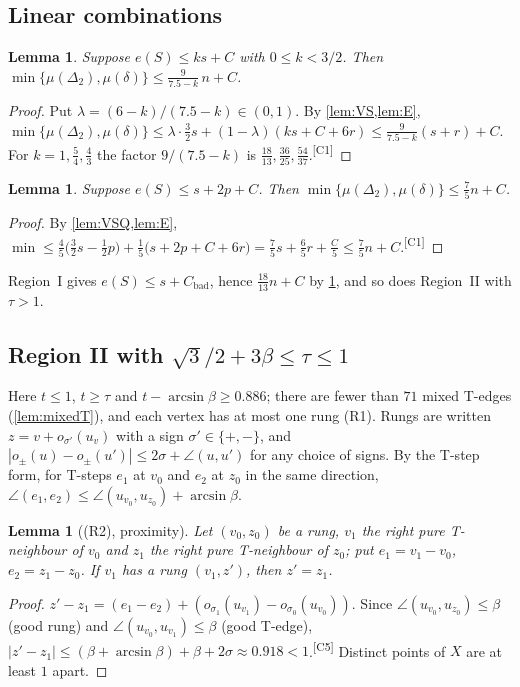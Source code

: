 \documentclass[11pt]{amsart}
\newtheorem{lemma}[theorem]{Lemma}
\theoremstyle{definition}
\theoremstyle{remark}
\newcommand{\Dt}{\Delta_2}
\newcommand{\mult}{\mu}
\newcommand{\chk}[1]{\textsuperscript{[#1]}}
\begin{document}
\subsection*{Linear combinations}
\begin{lemma}\label{lem:lp}
Suppose $e(S)\le k s+C$ with $0\le k<3/2$. Then $\min\{\mult(\Dt),\mult(\delta)\}\le \frac{9}{7.5-k}\,n+C$.
\end{lemma}
\begin{proof}
Put $\lambda=(6-k)/(7.5-k)\in(0,1)$. By \cref{lem:VS,lem:E},
$\min\{\mult(\Dt),\mult(\delta)\}\le\lambda\cdot\tfrac32 s+(1-\lambda)(ks+C+6r)\le \tfrac{9}{7.5-k}(s+r)+C$.
For $k=1,\frac54,\frac43$ the factor $9/(7.5-k)$ is $\frac{18}{13},\frac{36}{25},\frac{54}{37}$.\chk{C1}
\end{proof}

\begin{lemma}\label{lem:lp2}
Suppose $e(S)\le s+2p+C$. Then $\min\{\mult(\Dt),\mult(\delta)\}\le\frac75 n+C$.
\end{lemma}
\begin{proof}
By \cref{lem:VSQ,lem:E},
$\min\le\frac45\bigl(\frac32 s-\frac12p\bigr)+\frac15\bigl(s+2p+C+6r\bigr)=\frac75 s+\frac65 r+\frac C5\le\frac75n+C$.\chk{C1}
\end{proof}

Region~I gives $e(S)\le s+C_{\mathrm{bad}}$, hence $\frac{18}{13}n+C$ by \cref{lem:lp}, and so does Region~II with $\tau>1$.

\subsection*{Region II with \texorpdfstring{$\sqrt3/2+3\beta\le\tau\le1$}{sqrt3/2 + 3 beta <= tau <= 1}}
Here $t\le1$, $t\ge\tau$ and $t-\arcsin\beta\ge0.886$; there are fewer than $71$ mixed T-edges (\cref{lem:mixedT}), and each vertex has at most one rung (R1). Rungs are written $z=v+o_{\sigma'}(u_v)$ with a sign $\sigma'\in\{+,-\}$, and $|o_{\pm}(u)-o_{\pm}(u')|\le2\sigma+\angle(u,u')$ for any choice of signs. By the T-step form, for T-steps $e_1$ at $v_0$ and $e_2$ at $z_0$ in the same direction, $\angle(e_1,e_2)\le\angle(u_{v_0},u_{z_0})+\arcsin\beta$.

\begin{lemma}[(R2), proximity]\label{lem:R2}
Let $(v_0,z_0)$ be a rung, $v_1$ the right pure T-neighbour of $v_0$ and $z_1$ the right pure T-neighbour of $z_0$; put $e_1=v_1-v_0$, $e_2=z_1-z_0$. If $v_1$ has a rung $(v_1,z')$, then $z'=z_1$.
\end{lemma}
\begin{proof}
$z'-z_1=(e_1-e_2)+(o_{\sigma_1}(u_{v_1})-o_{\sigma_0}(u_{v_0}))$. Since $\angle(u_{v_0},u_{z_0})\le\beta$ (good rung) and $\angle(u_{v_0},u_{v_1})\le\beta$ (good T-edge), $|z'-z_1|\le(\beta+\arcsin\beta)+\beta+2\sigma\approx0.918<1$.\chk{C5} Distinct points of $X$ are at least $1$ apart.
\end{proof}
\end{document}
